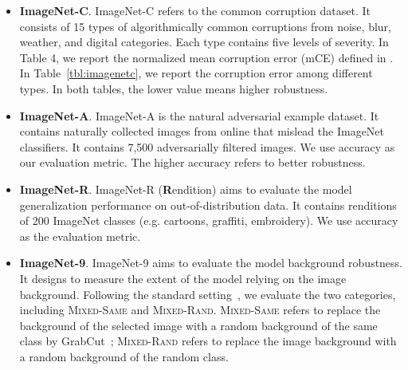 \vspace{-0.5em}
\begin{itemize}[leftmargin=1.5em]

    \item \textbf{ImageNet-C}. ImageNet-C refers to the common corruption dataset. It consists of 15 types of algorithmically common corruptions from noise, blur, weather, and digital categories. Each type contains five levels of severity. In Table 4, we report the normalized mean corruption error (mCE) defined in \citet{hendrycks2018imagenetc}.  In Table~\ref{tbl:imagenetc}, we report the corruption error among different types. In both tables, the lower value means higher robustness. 
        \item \textbf{ImageNet-A}. ImageNet-A is the natural adversarial example dataset. It contains naturally collected images from online that mislead the ImageNet classifiers. It contains 7,500 adversarially filtered images. We use accuracy as our evaluation metric. The higher accuracy refers to better robustness.        
        
    \item \textbf{ImageNet-R}. ImageNet-R (\textbf{R}endition) aims to evaluate the model generalization performance on out-of-distribution data.  It contains renditions of 200 ImageNet classes (e.g. cartoons, graffiti, embroidery). We use accuracy as the evaluation metric. 
    \item \textbf{ImageNet-9}. ImageNet-9 aims to evaluate the model background robustness. It designs to measure the extent of the model relying on the image background. Following the standard setting~\cite{xiao2020noise}, we evaluate the two categories, including \textsc{Mixed-Same} and \textsc{Mixed-Rand}. \textsc{Mixed-Same} refers to replace the background of the selected image with a random background of the same class by GrabCut~\cite{xiao2020noise}; \textsc{Mixed-Rand} refers to replace the image background with a random background of the random class.
\end{itemize}
\vspace{-0.5em}


